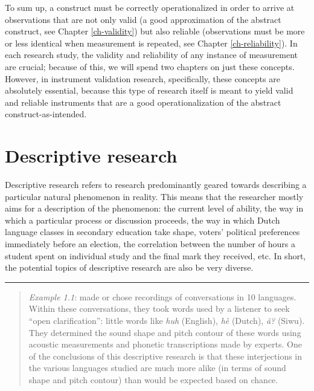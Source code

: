 \documentclass[
]{book}
\begin{document}
To sum up, a construct must be correctly operationalized in order to arrive at observations that are not only valid (a good approximation of the abstract construct, see Chapter \ref{ch-validity}) but also reliable (observations must be more or less identical when measurement is repeated, see Chapter \ref{ch-reliability}). In each research study, the validity and reliability of any instance of measurement are crucial; because of this, we will spend two chapters on just these concepts. However, in instrument validation research, specifically, these concepts are absolutely essential, because this type of research itself is meant to yield valid and reliable instruments that are a good operationalization of the abstract construct-as-intended.

\section{Descriptive research}\label{sec:descriptive-research}

Descriptive research refers to research predominantly geared towards describing a particular natural phenomenon in reality. This means that the researcher mostly aims for a description of the phenomenon: the current level of ability, the way in which a particular process or discussion proceeds, the way in which Dutch language classes in secondary education take shape, voters' political preferences immediately before an election, the correlation between the number of hours a student spent on individual study and the final mark they received, etc. In short, the potential topics of descriptive research are also be very diverse.

\begin{center}\rule{0.5\linewidth}{0.5pt}\end{center}

\begin{quote}
\emph{Example 1.1}: \citet{DTE13} made or chose recordings of conversations in 10 languages. Within these conversations, they took words used by a listener to seek ``open clarification'': little words like \emph{huh} (English), \emph{hè} (Dutch), \emph{ã?} (Siwu). They determined the sound shape and pitch contour of these words using acoustic measurements and phonetic transcriptions made by experts. One of the conclusions of this descriptive research is that these interjections in the various languages studied are much more alike (in terms of sound shape and pitch contour) than would be expected based on chance.
\end{quote}
\end{document}
